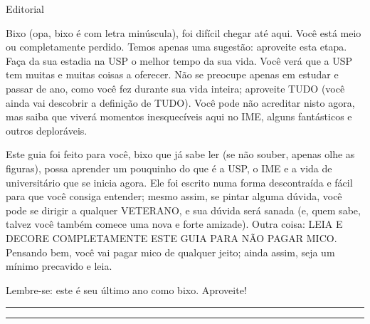 \begin{secao}{Editorial}

Bixo (opa, bixo é com letra minúscula), foi difícil chegar até aqui. Você está
meio ou completamente perdido. Temos apenas uma sugestão: aproveite esta etapa.
Faça da sua estadia na USP o melhor tempo da sua vida. Você verá que a USP tem
muitas e muitas coisas a oferecer. Não se preocupe apenas em estudar e passar de
ano, como você fez durante sua vida inteira; aproveite TUDO (você ainda vai
descobrir a definição de TUDO). Você pode não acreditar nisto agora, mas saiba
que viverá momentos inesquecíveis aqui no IME, alguns fantásticos e outros deploráveis. 

Este guia foi feito para você, bixo que já sabe ler (se não souber, apenas olhe
as figuras), possa aprender um pouquinho do que é a USP, o IME e a vida de
universitário que se inicia agora. Ele foi escrito numa forma descontraída e
fácil para que você consiga entender; mesmo assim, se pintar alguma dúvida,
você pode se dirigir a qualquer VETERANO, e sua dúvida será sanada (e, quem sabe,
talvez você também comece uma nova e forte amizade). Outra coisa: LEIA E DECORE
COMPLETAMENTE ESTE GUIA PARA NÃO PAGAR MICO. Pensando bem, você vai pagar mico
de qualquer jeito; ainda assim, seja um mínimo precavido e leia.

Lembre-se: este é seu último ano como bixo. Aproveite!

\rule{\textwidth}{0.5ex}\rule{2ex}{0.5ex}


\end{secao}
